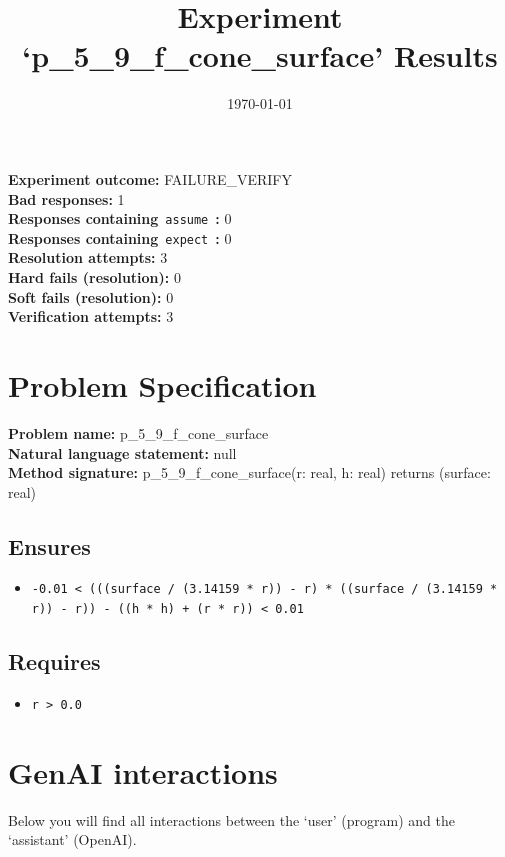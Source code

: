 \documentclass{article}
\begin{document}
\title{Experiment `p\_5\_9\_f\_cone\_surface' Results}
\author{\today}
\date{}
\maketitle
\textbf{Experiment outcome: }FAILURE\_VERIFY
\\\textbf{Bad responses: }1
\\\textbf{Responses containing}~\texttt{assume}~\textbf{: }0
\\\textbf{Responses containing}~\texttt{expect}~\textbf{: }0
\\\textbf{Resolution attempts: }3
\\\textbf{Hard fails (resolution): }0
\\\textbf{Soft fails (resolution): }0
\\\textbf{Verification attempts: }3
\section*{Problem Specification}
\textbf{Problem name: }p\_5\_9\_f\_cone\_surface
\\\textbf{Natural language statement: }null
\\\textbf{Method signature: }p\_5\_9\_f\_cone\_surface(r: real, h: real) returns (surface: real)
\subsection*{Ensures}
\begin{itemize}
\item \texttt{-0.01 < (((surface / (3.14159 * r)) - r) * ((surface / (3.14159 * r)) - r)) - ((h * h) + (r * r)) < 0.01}
\end{itemize}
\subsection*{Requires}
\begin{itemize}
\item \texttt{r > 0.0}
\end{itemize}
\clearpage
\section*{GenAI interactions}
Below you will find all interactions between the `user' (program) and the `assistant' (OpenAI).
\end{document}
